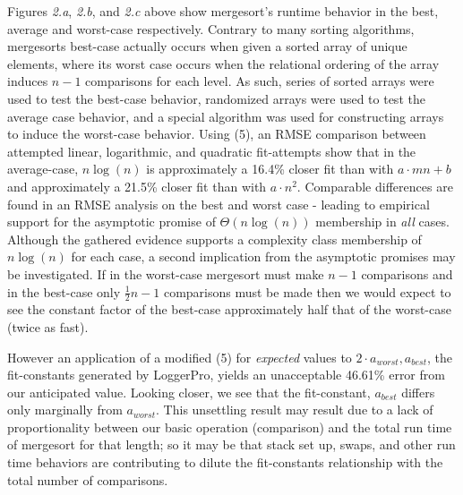 \documentclass[11pt,letterpaper]{report}
\begin{document}
Figures \emph{2.a}, \emph{2.b}, and \emph{2.c} above show mergesort's runtime behavior in the best, average and worst-case respectively. Contrary to many sorting algorithms, mergesorts best-case actually occurs when given a sorted array of unique elements, where its worst case occurs when the relational ordering of the array induces $n-1$ comparisons for each level. As such, series of sorted arrays were used to test the best-case behavior, randomized arrays were used to test the average case behavior, and a special algorithm was used for constructing arrays to induce the worst-case behavior.
Using (5), an RMSE comparison between attempted linear, logarithmic, and quadratic fit-attempts show that in the average-case, $n\log{}(n)$ is approximately a 16.4\% closer fit than with $a \cdot mn+b$ and approximately a 21.5\% closer fit than with $a \cdot n^2$. Comparable differences are found in an RMSE analysis on the best and worst case - leading to empirical support for the asymptotic promise of $\Theta(n\log{}(n))$ membership in \emph{all} cases.
Although the gathered evidence supports a complexity class membership of $n \log{}(n)$ for each case, a second implication from the asymptotic promises may be investigated. If in the worst-case mergesort must make $n-1$ comparisons and in the best-case only $\frac{1}{2}n-1$ comparisons must be made then we would expect to see the constant factor of the best-case approximately half that of the worst-case (twice as fast). 

However an application of a modified (5) for \emph{expected} values to $2 \cdot a_{worst}, a_{best}$, the fit-constants generated by LoggerPro, yields an unacceptable 46.61\% error from our anticipated value. Looking closer, we see that the fit-constant, $a_{best}$ differs only marginally from $a_{worst}$. This unsettling result may result due to a lack of proportionality between our basic operation (comparison) and the total run time of mergesort for that length; so it may be that stack set up, swaps, and other run time behaviors are contributing to dilute the fit-constants relationship with the total number of comparisons.
\end{document}
